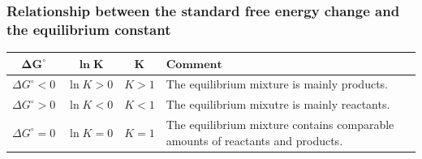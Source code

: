 \documentclass[11pt]{article}
\begin{document}
\subsubsection{Relationship between the standard free energy change and the equilibrium constant}
\label{sec:org17b3812}

\begin{center}
\begin{tabular}{c|c|c|m{20em}}
\(\boldsymbol{\Delta G^{\circ}}\) & \(\boldsymbol{\ln K}\) & \(\boldsymbol{K}\) & \(\textbf{Comment}\) \\
\hline
\(\Delta G^{\circ} < 0\) & \(\ln K > 0\) & \(K > 1\) & The equilibrium mixture is mainly products. \\
\(\Delta G^{\circ} > 0\) & \(\ln K < 0\) & \(K < 1\) & The equilibrium mixutre is mainly reactants. \\
\(\Delta G^{\circ} = 0\) & \(\ln K = 0\) & \(K = 1\) & The equilibrium mixture contains comparable amounts of reactants and products.
\end{tabular}
\end{center}
\end{document}
